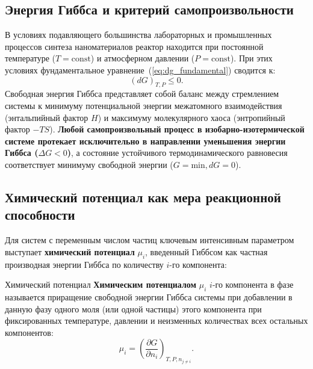 \documentclass[12pt,a4paper]{article}
\begin{document}
\subsection{Энергия Гиббса и критерий самопроизвольности}
В условиях подавляющего большинства лабораторных и промышленных процессов синтеза наноматериалов реактор находится при постоянной температуре ($T = \mathrm{const}$) и атмосферном давлении ($P = \mathrm{const}$). При этих условиях фундаментальное уравнение~(\ref{eq:dg_fundamental}) сводится к:
\begin{equation}
(dG)_{T,P} \le 0.
\label{eq:gibbs_criterion}
\end{equation}
Свободная энергия Гиббса представляет собой баланс между стремлением системы к минимуму потенциальной энергии межатомного взаимодействия (энтальпийный фактор $H$) и максимуму молекулярного хаоса (энтропийный фактор $-TS$). \textbf{Любой самопроизвольный процесс в изобарно-изотермической системе протекает исключительно в направлении уменьшения энергии Гиббса ($\Delta G < 0$)}, а состояние устойчивого термодинамического равновесия соответствует минимуму свободной энергии ($G = \mathrm{min}, dG = 0$).

\subsection{Химический потенциал как мера реакционной способности}
Для систем с переменным числом частиц ключевым интенсивным параметром выступает \textbf{химический потенциал} $\mu_i$, введенный Гиббсом как частная производная энергии Гиббса по количеству $i$-го компонента:

\begin{defbox}{Химический потенциал}
\textbf{Химическим потенциалом} $\mu_i$ $i$-го компонента в фазе называется приращение свободной энергии Гиббса системы при добавлении в данную фазу одного моля (или одной частицы) этого компонента при фиксированных температуре, давлении и неизменных количествах всех остальных компонентов:
\begin{equation}
\mu_i = \left( \frac{\partial G}{\partial n_i} \right)_{T, P, n_{j \ne i}}.
\label{eq:chem_pot_def}
\end{equation}
\end{defbox}
\end{document}
